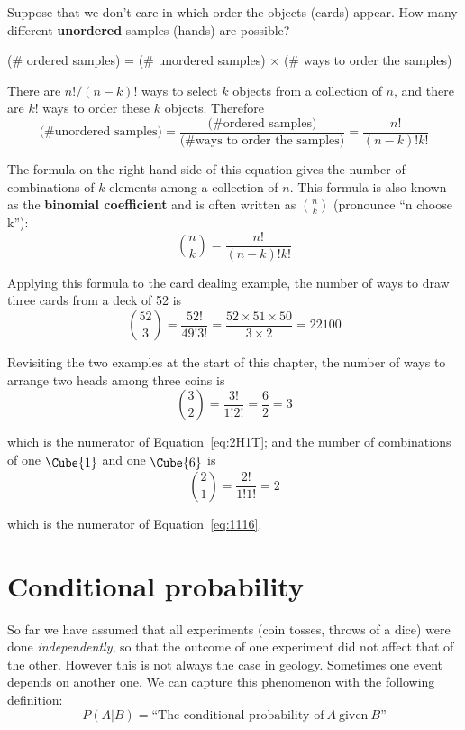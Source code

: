 Suppose that we don't care in which order the objects (cards)
appear. How many different \textbf{unordered} samples (hands) are
possible?

\begin{center}
  (\# ordered samples) =
  (\# unordered samples) $\times$ (\# ways to order the samples)
\end{center}

There are $n!/(n-k)!$ ways to select $k$ objects from a collection of
$n$, and there are $k!$ ways to order these $k$ objects. Therefore
\[
\mbox{
  (\# unordered samples)} =
\frac{\mbox{(\# ordered samples)}}{\mbox{(\# ways to order the samples)}
} =
\frac{n!}{(n-k)!k!}
\]

The formula on the right hand side of this equation gives the number
of combinations of $k$ elements among a collection of $n$.  This
formula is also known as the \textbf{binomial coefficient} and is
often written as $\binom{n}{k}$ (pronounce ``n choose k''):
\begin{equation}
  \binom{n}{k} = \frac{n!}{(n-k)!k!}
  \label{eq:nchoosek}
\end{equation}

Applying this formula to the card dealing example, the number
of ways to draw three cards from a deck of 52 is
\[
\binom{52}{3} = \frac{52!}{49!3!} =
\frac{52\times{51}\times{50}}{3\times{2}} = 22100
\]

Revisiting the two examples at the start of this chapter, the number
of ways to arrange two heads among three coins is
\[
\binom{3}{2} = \frac{3!}{1!2!} = \frac{6}{2} = 3
\]

\noindent which is the numerator of Equation~\ref{eq:2H1T}; and the
number of combinations of one $\raisebox{-2pt}{\Cube{1}}$ and one
$\raisebox{-2pt}{\Cube{6}}$ is
\[
\binom{2}{1} = \frac{2!}{1!1!} = 2
\]

\noindent which is the numerator of Equation~\ref{eq:1116}.

\section{Conditional probability}
\label{sec:conditionalprobability}

So far we have assumed that all experiments (coin tosses, throws of a
dice) were done \emph{independently}, so that the outcome of one
experiment did not affect that of the other. However this is not
always the case in geology. Sometimes one event depends on another
one. We can capture this phenomenon with the following definition:
\begin{equation}
P(A|B) = \mbox{``The conditional probability of}~A~\mbox{given}~B\mbox{''}
\end{equation}

